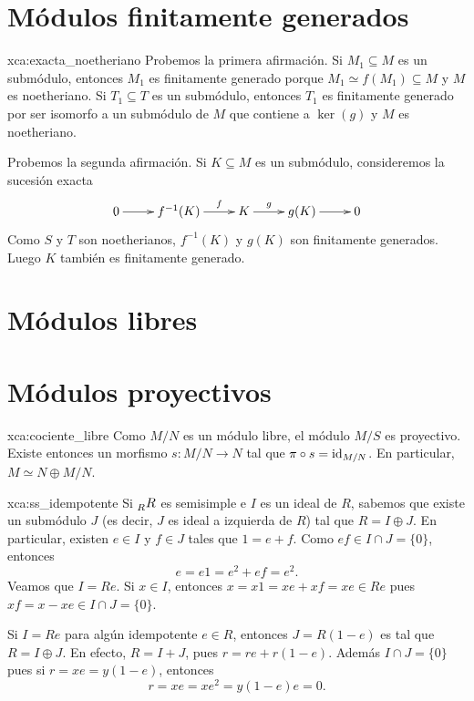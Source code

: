 \section*{Módulos finitamente generados}

\begin{sol}{xca:exacta_noetheriano}
	Probemos la primera afirmación. Si $M_1\subseteq M$ es un submódulo, entonces
	$M_1$ es finitamente generado porque $M_1\simeq f(M_1)\subseteq M$ y $M$ es
	noetheriano. Si $T_1\subseteq T$ es un submódulo, entonces $T_1$ es
	finitamente generado por ser isomorfo a un submódulo de $M$ que
	contiene a $\ker(g)$ y $M$ es noetheriano.

	Probemos la segunda afirmación. Si $K\subseteq M$ es un submódulo,
	consideremos la sucesión exacta
	\[
		\xymatrix{
		0\ar[r] 
		& f^{-1}(K)
		\ar[r]^-{f}
		& K
		\ar[r]^-{g}
		& g(K)\ar[r]
		& 0
		}
	\]
	Como $S$ y $T$ son noetherianos, $f^{-1}(K)$ y $g(K)$ son finitamente
	generados. Luego $K$ también es finitamente
	generado.
\end{sol}

\section*{Módulos libres}

\section*{Módulos proyectivos}

\begin{sol}{xca:cociente_libre}
Como $M/N$ es un módulo libre, el módulo $M/S$ es proyectivo. Existe entonces un morfismo $s\colon M/N\to N$ tal 
que $\pi\circ s=\operatorname{id}_{M/N}$. En particular, $M\simeq N\oplus M/N$. 	
\end{sol}

\begin{sol}{xca:ss_idempotente}
Si $\prescript{}{R}R$ es semisimple e $I$ es un ideal de $R$, sabemos que existe un submódulo $J$ (es decir, $J$ es ideal a izquierda de $R$) tal que $R=I\oplus J$. En particular, 
existen $e\in I$ y $f\in J$ tales que $1=e+f$. Como $ef\in I\cap J=\{0\}$, entonces
\[
e=e1=e^2+ef=e^2.
\]
Veamos que $I=Re$. Si $x\in I$, entonces $x=x1=xe+xf=xe\in Re$ pues $xf=x-xe\in I\cap J=\{0\}$. 

Si $I=Re$ para algún idempotente $e\in R$, entonces $J=R(1-e)$ es tal que $R=I\oplus J$. En efecto, $R=I+J$, pues 
$r=re+r(1-e)$. Además $I\cap J=\{0\}$ pues si $r=xe=y(1-e)$, entonces 
\[
r=xe=xe^2=y(1-e)e=0.
\]
\end{sol}

